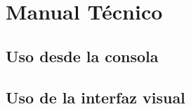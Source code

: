 \chapter{Manual Técnico}

\section{Uso desde la consola}




\section{Uso de la interfaz visual}





